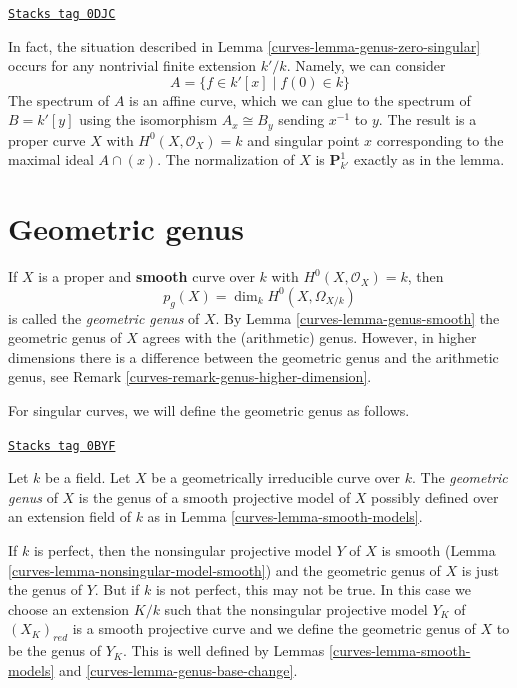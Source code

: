 \begin{example}[Squish on P1]
\label{curves-example-squish-on-P1}
\href{https://stacks.math.columbia.edu/tag/0DJC}{\texttt{Stacks tag 0DJC}}

In fact, the situation described in Lemma \ref{curves-lemma-genus-zero-singular}
occurs for any nontrivial finite extension $k'/k$. Namely, we can consider
$$
A = \{f \in k'[x] \mid f(0) \in k \}
$$
The spectrum of $A$ is an affine curve, which we can glue to
the spectrum of $B = k'[y]$ using the isomorphism
$A_x \cong B_y$ sending $x^{-1}$ to $y$.
The result is a proper curve $X$ with $H^0(X, \mathcal{O}_X) = k$
and singular point $x$ corresponding to the maximal ideal $A \cap (x)$.
The normalization of $X$ is $\mathbf{P}^1_{k'}$ exactly as in the lemma.
\end{example}

\section{Geometric genus}
\label{curves-section-geometric-genus}
If $X$ is a proper and {\bf smooth} curve over $k$ with
$H^0(X, \mathcal{O}_X) = k$, then
$$
p_g(X) = \dim_k H^0(X, \Omega_{X/k})
$$
is called the {\it geometric genus} of $X$. By Lemma \ref{curves-lemma-genus-smooth}
the geometric genus of $X$ agrees with the (arithmetic) genus. However,
in higher dimensions there is a difference between the geometric genus
and the arithmetic genus, see Remark \ref{curves-remark-genus-higher-dimension}.

\medskip\noindent
For singular curves, we will define the geometric genus as follows.

\begin{definition}
\label{curves-definition-geometric-genus}
\href{https://stacks.math.columbia.edu/tag/0BYF}{\texttt{Stacks tag 0BYF}}

Let $k$ be a field. Let $X$ be a geometrically irreducible
curve over $k$. The {\it geometric genus} of $X$ is the genus
of a smooth projective model of $X$ possibly defined over
an extension field of $k$ as in
Lemma \ref{curves-lemma-smooth-models}.
\end{definition}

If $k$ is perfect, then the nonsingular projective model $Y$ of $X$
is smooth (Lemma \ref{curves-lemma-nonsingular-model-smooth})
and the geometric genus of $X$ is just the genus of $Y$.
But if $k$ is not perfect, this may not be true.
In this case we choose an extension $K/k$ such that
the nonsingular projective model $Y_K$ of $(X_K)_{red}$ is
a smooth projective curve and we define the geometric genus
of $X$ to be the genus of $Y_K$. This is well defined by
Lemmas \ref{curves-lemma-smooth-models} and \ref{curves-lemma-genus-base-change}.

